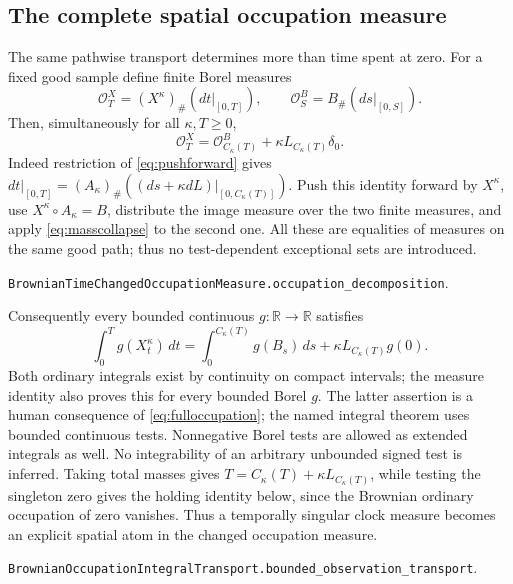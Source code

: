 \documentclass[11pt]{article}
\newcommand{\R}{\mathbb R}
\newcommand{\code}[1]{\texttt{\small #1}}
\begin{document}
\subsection*{The complete spatial occupation measure}
The same pathwise transport determines more than time spent at zero.
For a fixed good sample define finite Borel measures
\[
 \mathcal O_T^X=(X^\kappa)_\#(dt|_{[0,T]}),\qquad
 \mathcal O_S^B=B_\#(ds|_{[0,S]}).
\]
Then, simultaneously for all $\kappa,T\geq0$,
\begin{equation}\label{eq:fulloccupation}
 \mathcal O_T^X=\mathcal O_{C_\kappa(T)}^B
                  +\kappa L_{C_\kappa(T)}\delta_0.
\end{equation}
Indeed restriction of \eqref{eq:pushforward} gives
$dt|_{[0,T]}=(A_\kappa)_\#
((ds+\kappa dL)|_{[0,C_\kappa(T)]})$.
Push this identity forward by $X^\kappa$, use
$X^\kappa\circ A_\kappa=B$, distribute the image measure over
the two finite measures, and apply \eqref{eq:masscollapse} to
the second one. All these are equalities of measures on the same
good path; thus no test-dependent exceptional sets are introduced.
\par\noindent\code{BrownianTimeChangedOccupationMeasure.occupation\_decomposition}.

Consequently every bounded continuous $g:\R\to\R$ satisfies
\begin{equation}\label{eq:occupationtest}
 \int_0^T g(X_t^\kappa)\,dt
 =\int_0^{C_\kappa(T)}g(B_s)\,ds
       +\kappa L_{C_\kappa(T)}g(0).
\end{equation}
Both ordinary integrals exist by continuity on compact intervals;
the measure identity also proves this for every bounded Borel $g$.
The latter assertion is a human consequence of
\eqref{eq:fulloccupation}; the named integral theorem uses bounded
continuous tests. Nonnegative Borel tests are allowed as extended
integrals as well. No integrability of an arbitrary unbounded signed
test is inferred. Taking total masses gives
$T=C_\kappa(T)+\kappa L_{C_\kappa(T)}$, while testing the
singleton zero gives the holding identity below, since the Brownian
ordinary occupation of zero vanishes. Thus a temporally singular
clock measure becomes an explicit spatial atom in the changed
occupation measure.
\par\noindent\code{BrownianOccupationIntegralTransport.bounded\_observation\_transport}.
\end{document}
